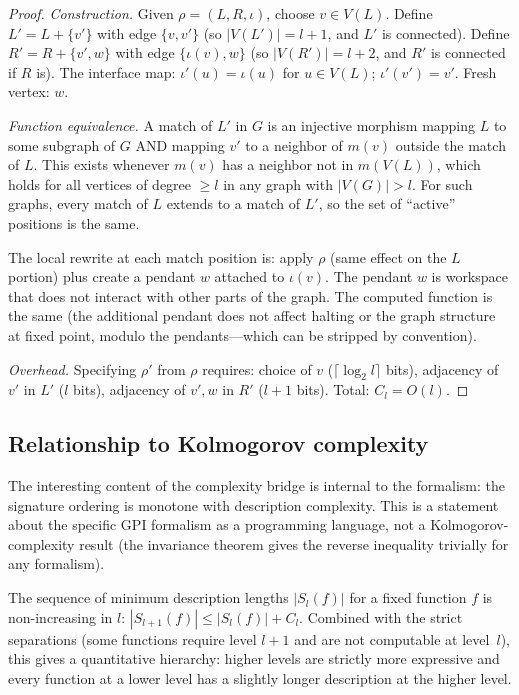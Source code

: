 \documentclass{../shared/primo}
\begin{document}
\begin{proof}
\emph{Construction.} Given $\rho = (L, R, \iota)$, choose $v \in V(L)$. Define $L' = L + \{v'\}$ with edge $\{v, v'\}$ (so $|V(L')| = l + 1$, and $L'$ is connected). Define $R' = R + \{v', w\}$ with edge $\{\iota(v), w\}$ (so $|V(R')| = l + 2$, and $R'$ is connected if $R$ is). The interface map: $\iota'(u) = \iota(u)$ for $u \in V(L)$; $\iota'(v') = v'$. Fresh vertex: $w$.

\emph{Function equivalence.} A match of $L'$ in $G$ is an injective morphism mapping $L$ to some subgraph of $G$ AND mapping $v'$ to a neighbor of $m(v)$ outside the match of $L$. This exists whenever $m(v)$ has a neighbor not in $m(V(L))$, which holds for all vertices of degree $\geq l$ in any graph with $|V(G)| > l$. For such graphs, every match of $L$ extends to a match of $L'$, so the set of ``active'' positions is the same.

The local rewrite at each match position is: apply $\rho$ (same effect on the $L$ portion) plus create a pendant $w$ attached to $\iota(v)$. The pendant $w$ is workspace that does not interact with other parts of the graph. The computed function is the same (the additional pendant does not affect halting or the graph structure at fixed point, modulo the pendants---which can be stripped by convention).

\emph{Overhead.} Specifying $\rho'$ from $\rho$ requires: choice of $v$ ($\lceil \log_2 l \rceil$ bits), adjacency of $v'$ in $L'$ ($l$ bits), adjacency of $v', w$ in $R'$ ($l + 1$ bits). Total: $C_l = O(l)$.
\end{proof}

\subsection{Relationship to Kolmogorov complexity}
\label{sec:kolmogorov}

The interesting content of the complexity bridge is internal to the formalism: the signature ordering is monotone with description complexity. This is a statement about the specific GPI formalism as a programming language, not a Kolmogorov-complexity result (the invariance theorem gives the reverse inequality trivially for any formalism).

\begin{corollary}
The sequence of minimum description lengths $|S_l(f)|$ for a fixed function $f$ is non-increasing in $l$: $|S_{l+1}(f)| \leq |S_l(f)| + C_l$. Combined with the strict separations (some functions require level $l+1$ and are not computable at level~$l$), this gives a quantitative hierarchy: higher levels are strictly more expressive and every function at a lower level has a slightly longer description at the higher level.
\end{corollary}
\end{document}
